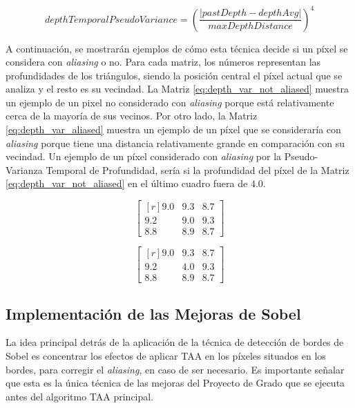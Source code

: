 \documentclass[pregrado]{tesis-usb} %
\begin{document}
\begin{equation} \label{eq:depthtemporalpseudovariance}
depthTemporalPseudoVariance = \left( \frac{\left|pastDepth-depthAvg\right|}{maxDepthDistance}\right)^4
\end{equation}

A continuación, se mostrarán ejemplos de cómo esta técnica decide si un píxel se considera con \textit{aliasing} o no. Para cada matriz, los números representan las profundidades de los triángulos, siendo la posición central el píxel actual que se analiza y el resto es su vecindad. La Matriz \ref{eq:depth_var_not_aliased} muestra un ejemplo de un pixel no considerado con \textit{aliasing} porque está relativamente cerca de la mayoría de sus vecinos. Por otro lado, la Matriz \ref{eq:depth_var_aliased} muestra un ejemplo de un píxel que se consideraría con \textit{aliasing} porque tiene una distancia relativamente grande en comparación con su vecindad. Un ejemplo de un píxel considerado con \textit{aliasing} por la Pseudo-Varianza Temporal de Profundidad, sería si la profundidad del píxel de la Matriz \ref{eq:depth_var_not_aliased} en el último cuadro fuera de $4.0$.

\begin{equation}\label{eq:depth_var_not_aliased}
\begin{bmatrix*}[r]
9.0 &  9.3 & 8.7 \\
9.2 &  9.0 & 9.3 \\
8.8 &  8.9 & 8.7
\end{bmatrix*}
\end{equation}

\begin{equation}\label{eq:depth_var_aliased}
\begin{bmatrix*}[r]
9.0 &  9.3 & 8.7 \\
9.2 &  4.0 & 9.3 \\
8.8 &  8.9 & 8.7
\end{bmatrix*}
\end{equation}

\subsection{Implementación de las Mejoras de Sobel}
La idea principal detrás de la aplicación de la técnica de detección de bordes de Sobel es concentrar los efectos de aplicar TAA en los píxeles situados en los bordes, para corregir el \textit{aliasing}, en caso de ser necesario. Es importante señalar que esta es la única técnica de las mejoras del Proyecto de Grado que se ejecuta antes del algoritmo TAA principal.
\end{document}
